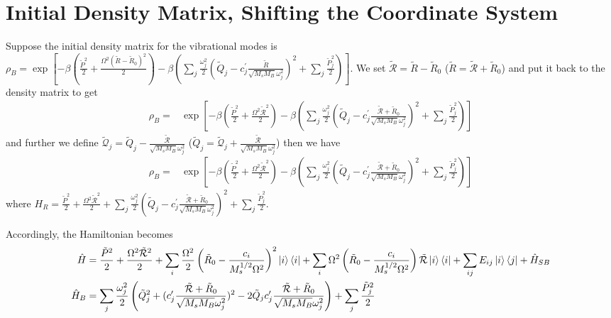 \documentclass{article}
\begin{document}
\section*{Initial Density Matrix, Shifting the Coordinate System}
Suppose the initial density matrix for the vibrational modes is $\rho_B = \exp[-\beta (\frac{\tilde{P}^{2}}{2}
+ \frac{\Omega^{2}(\tilde{R}-\tilde{R}_0)^2}{2})-\beta(\sum_j \frac{\omega_{j}^{2}}{2} \left(\tilde{Q}_{j}-c^{\prime}_{j} \frac{\tilde{R}}{\sqrt{M_sM_{B}} \omega_{j}^{2}}\right)^{2} + \sum_j\frac{\tilde{P}_j^2}{2})]$. We set $\tilde{\mathcal{R}}=\tilde{R}-\tilde{R}_0$ ($\tilde{R}=\tilde{\mathcal{R}}+\tilde{R}_0$) and put it back to the density matrix to get
\begin{align*}
	\rho_B =& \exp[-\beta (\frac{\tilde{P}^{2}}{2}
	+ \frac{\Omega^{2}\tilde{\mathcal{R}}^2}{2})-\beta(\sum_j \frac{\omega_{j}^{2}}{2} \left(\tilde{Q}_{j}-c^{\prime}_{j} \frac{\tilde{\mathcal{R}}+\tilde{R}_0}{\sqrt{M_sM_{B}} \omega_{j}^{2}}\right)^{2} + \sum_j\frac{\tilde{P}_j^2}{2})]
\end{align*}
and further we define $\tilde{\mathcal{Q}}_j = \tilde{Q}_j-\frac{\tilde{\mathcal{R}}}{\sqrt{M_sM_B}\omega_j^2}$ ($\tilde{Q}_j=\tilde{\mathcal{Q}}_j  +\frac{\tilde{\mathcal{R}}}{\sqrt{M_sM_B}\omega_j^2}$) then we have  
\begin{align*}
	\rho_B =& \exp[-\beta (\frac{\tilde{P}^{2}}{2}
	+ \frac{\Omega^{2}\tilde{\mathcal{R}}^2}{2})-\beta(\sum_j \frac{\omega_{j}^{2}}{2} \left(\tilde{Q}_{j}-c^{\prime}_{j} \frac{\tilde{\mathcal{R}}+\tilde{R}_0}{\sqrt{M_sM_{B}} \omega_{j}^{2}}\right)^{2} + \sum_j\frac{\tilde{P}_j^2}{2})]
\end{align*} 
where $H_R = \frac{\tilde{P}^{2}}{2}
+ \frac{\Omega^{2}\tilde{\mathcal{R}}^2}{2}+\sum_j \frac{\omega_{j}^{2}}{2} \left(\tilde{Q}_{j}-c^{\prime}_{j} \frac{\tilde{\mathcal{R}}+\tilde{R}_0}{\sqrt{M_sM_{B}} \omega_{j}^{2}}\right)^{2} + \sum_j\frac{\tilde{P}_j^2}{2}$.

Accordingly, the Hamiltonian becomes
\begin{align*}
	\hat{H} &= \frac{\tilde{P}^{2}}{2}
	+\frac{\Omega^2\tilde{\mathcal{R}}^2}{2}
	+\sum_i\frac{\Omega^2}{2}\left(\tilde{R}_0-\frac{c_{i}}{M_{s}^{1/2} \Omega^{2}}\right)^2\ket{i}\bra{i}
	+\sum_{i} \Omega^{2} \left(\tilde{R}_0-\frac{c_{i}}{M_{s}^{1/2} \Omega^{2}}\right)\tilde{\mathcal{R}}\ket{i}\bra{i}
	+\sum_{ij}E_{ij}\ket{i}\bra{j}+\hat{H}_{S B}\\
	\hat{H}_{B} &= 
	\sum_j \frac{\omega_{j}^{2}}{2} \left(
	\tilde{Q}_{j}^2+(c^{\prime}_{j} \frac{\tilde{\mathcal{R}}+\tilde{R}_0}{\sqrt{M_sM_{B}} \omega_{j}^{2}})^2-2\tilde{Q}_{j}c^{\prime}_{j} \frac{\tilde{\mathcal{R}}+\tilde{R}_0}{\sqrt{M_sM_{B}} \omega_{j}^{2}}
	\right)
	+ \sum_j\frac{\tilde{P}_j^2}{2}
\end{align*}
\end{document}
